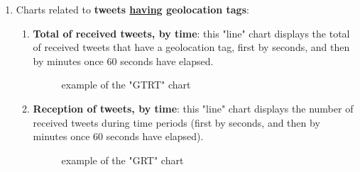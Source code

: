 \documentclass[a4paper,11pt]{report}
\begin{document}
\begin{enumerate}
	\item Charts related to \textbf{tweets \underline{having} geolocation tags}:
	\begin{enumerate}
		\item \textbf{Total of received tweets, by time}: this "line" chart displays the total of received tweets that have a geolocation tag, first by seconds, and then by minutes once 60 seconds have elapsed.
		\begin{figure}[H]
		\vspace{-5pt}
		\begin{center}
		\vspace{-5pt}
		\caption{example of the "GTRT" chart}
		\end{center}
		\end{figure}
		\vspace{-10pt}

		\item \textbf{Reception of tweets, by time}: this "line" chart displays the number of received tweets during time periods (first by seconds, and then by minutes once 60 seconds have elapsed).
		\begin{figure}[H]
		\vspace{-5pt}
		\begin{center}
		\vspace{-5pt}
		\caption{example of the "GRT" chart}
		\end{center}
		\end{figure}
		\vspace{-10pt}


\end{enumerate}
\end{enumerate}
\end{document}
